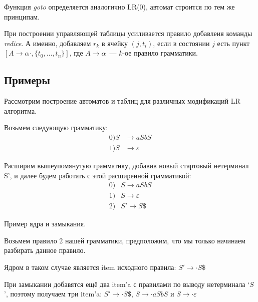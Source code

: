 Функция \textit{goto} определяется аналогично LR(0), автомат строится по тем же принципам.

При построении управляющей таблицы усиливается правило добавлеия команды \textit{redice}.
А именно, добавляем $r_k$ в ячейку $(j,t_i)$, если в состоянии $j$ есть пункт $[A \to \alpha \cdot, \{t_0, \dots, t_n\}]$, где $A \to \alpha$~--- $k$-ое правило грамматики.

\subsection{Примеры}

Рассмотрим построение автоматов и таблиц для различных модификаций LR алгоритма.

Возьмем следующую грамматику:
\begin{align*}
0) S & \rightarrow a S b S \\
1) S & \rightarrow \varepsilon
\end{align*}

Расширим вышеупомянутую грамматику, добавив новый стартовый нетерминал S', и далее будем работать с этой расширенной грамматикой:
\begin{align*}
0)& S \rightarrow a S b S \\
1)& S \rightarrow \varepsilon \\
2)& S' \rightarrow S \$
\end{align*}


\begin{example}
Пример ядра и замыкания.

Возьмем правило 2 нашей грамматики, предположим, что мы только начинаем разбирать данное правило.

Ядром в таком случае является item исходного правила: $S' \rightarrow \cdot S \$$

При замыкании добавятся ещё два item'a с правилами по выводу нетерминала `$S$', поэтому получаем три item'a: $S' \rightarrow \cdot S\$$, $S \rightarrow \cdot aSbS$ и $S \rightarrow \cdot \varepsilon$
\end{example}


